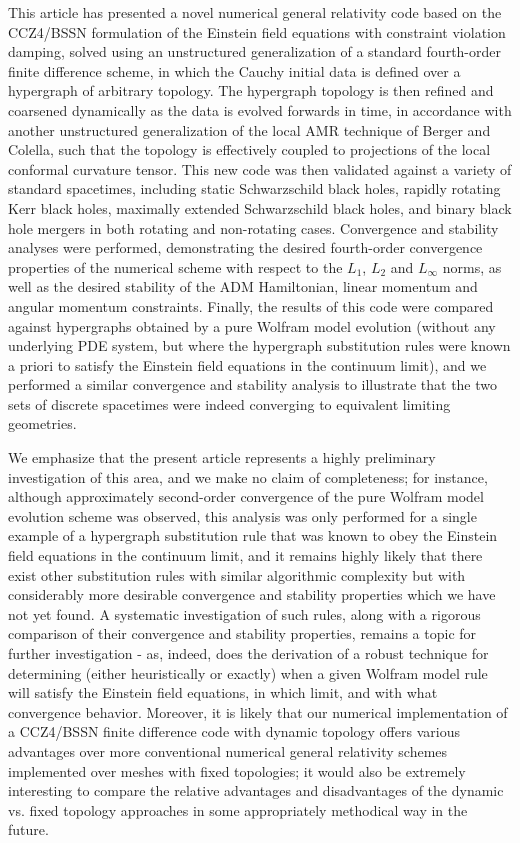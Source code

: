 \documentclass{article}
\begin{document}
This article has presented a novel numerical general relativity code based on the CCZ4/BSSN formulation of the Einstein field equations with constraint violation damping, solved using an unstructured generalization of a standard fourth-order finite difference scheme, in which the Cauchy initial data is defined over a hypergraph of arbitrary topology. The hypergraph topology is then refined and coarsened dynamically as the data is evolved forwards in time, in accordance with  another unstructured generalization of the local AMR technique of Berger and Colella, such that the topology is effectively coupled to projections of the local conformal curvature tensor. This new code was then validated against a variety of standard spacetimes, including static Schwarzschild black holes, rapidly rotating Kerr black holes, maximally extended Schwarzschild black holes, and binary black hole mergers in both rotating and non-rotating cases. Convergence and stability analyses were performed, demonstrating the desired fourth-order convergence properties of the numerical scheme with respect to the ${L_1}$, ${L_2}$ and ${L_{\infty}}$ norms, as well as the desired stability of the ADM Hamiltonian, linear momentum and angular momentum constraints. Finally, the results of this code were compared against hypergraphs obtained by a pure Wolfram model evolution (without any underlying PDE system, but where the hypergraph substitution rules were known a priori to satisfy the Einstein field equations in the continuum limit), and we performed a similar convergence and stability analysis to illustrate that the two sets of discrete spacetimes were indeed converging to equivalent limiting geometries.

We emphasize that the present article represents a highly preliminary investigation of this area, and we make no claim of completeness; for instance, although approximately second-order convergence of the pure Wolfram model evolution scheme was observed, this analysis was only performed for a single example of a hypergraph substitution rule that was known to obey the Einstein field equations in the continuum limit, and it remains highly likely that there exist other substitution rules with similar algorithmic complexity but with considerably more desirable convergence and stability properties which we have not yet found. A systematic investigation of such rules, along with a rigorous comparison of their convergence and stability properties, remains a topic for further investigation - as, indeed, does the derivation of a robust technique for determining (either heuristically or exactly) when a given Wolfram model rule will satisfy the Einstein field equations, in which limit, and with what convergence behavior. Moreover, it is likely that our numerical implementation of a CCZ4/BSSN finite difference code with dynamic topology offers various advantages over more conventional numerical general relativity schemes implemented over meshes with fixed topologies; it would also be extremely interesting to compare the relative advantages and disadvantages of the dynamic vs. fixed topology approaches in some appropriately methodical way in the future.
\end{document}
